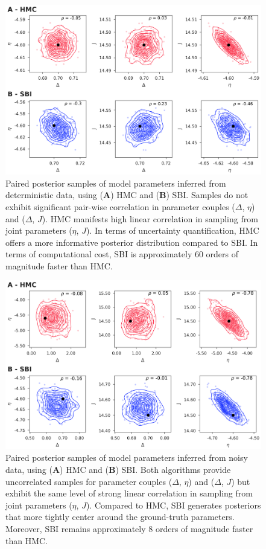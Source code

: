 \documentclass[preprint,11pt,authoryear]{elsarticle}
\begin{document}
\begin{figure}[ht]
    \centering
    \includegraphics[width=\linewidth]{Figs/FigS4.png}
    \renewcommand{\thefigure}{S\arabic{figure}}
            \caption{Paired posterior samples of model parameters inferred from deterministic data, using (\textbf{A}) HMC and (\textbf{B}) SBI. Samples do not exhibit significant pair-wise correlation in parameter couples ($\Delta$, $\eta$) and ($\Delta$, $J$). HMC manifests high linear correlation in sampling from joint parameters ($\eta$, $J$). In terms of uncertainty quantification, HMC offers a more informative posterior distribution compared to SBI. In terms of computational cost, SBI is approximately 60 orders of magnitude faster than HMC.}
    \label{fig:ODE_joint_posterior}
\end{figure}



\begin{figure}
    \centering
    \includegraphics[width=\linewidth]{Figs/FigS5.png}
    \renewcommand{\thefigure}{S\arabic{figure}}
    \caption{Paired posterior samples of model parameters inferred from noisy data, using (\textbf{A}) HMC and (\textbf{B}) SBI. Both algorithms provide uncorrelated samples for parameter couples ($\Delta$, $\eta$) and ($\Delta$, $J$) but exhibit the same level of strong linear correlation in sampling from joint parameters ($\eta$, $J$). Compared to HMC, SBI generates posteriors that more tightly center around the ground-truth parameters. Moreover, SBI remains approximately 8 orders of magnitude faster than HMC.}
    \label{fig:SDE_joint_posterior}
\end{figure}
\end{document}
